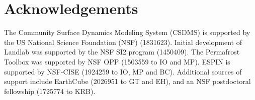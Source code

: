 \documentclass{article} %
\begin{document}
\section{Acknowledgements}

The Community Surface Dynamics Modeling System (CSDMS) is supported by the US National Science Foundation (NSF) (1831623). Initial development of Landlab was supported by the NSF SI2 program (1450409). The Permafrost Toolbox was supported by NSF OPP (1503559 to IO and MP). ESPIN is supported by NSF-CISE (1924259 to IO, MP and BC). Additional sources of support include EarthCube (2026951 to GT and EH), and an NSF postdoctoral fellowship (1725774 to KRB). %




\end{document}
